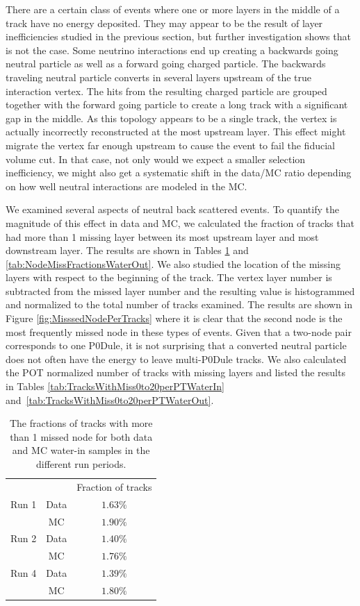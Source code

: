 There are a certain class of events where one or more layers in the middle of a track have no energy deposited. They may appear to be the result of layer inefficiencies studied in the previous section, but further investigation shows that is not the case. Some neutrino interactions end up creating a backwards going neutral particle as well as a forward going charged particle. The backwards traveling neutral particle converts in several layers upstream of the true interaction vertex. The hits from the resulting charged particle are grouped together with the forward going particle to create a long track with a significant gap in the middle. As this topology appears to be a single track, the vertex is actually incorrectly reconstructed at the most upstream layer. This effect might migrate the vertex far enough upstream to cause the event to fail the fiducial volume cut. In that case, not only would we expect a smaller selection inefficiency, we might also get a systematic shift in the data/MC ratio depending on how well neutral interactions are modeled in the MC. 

We examined several aspects of neutral back scattered events. To quantify the magnitude of this effect in data and MC, we calculated the fraction of tracks that had more than 1 missing layer between its most upstream layer and most downstream layer. The results are shown in Tables \ref{tab:NodeMissFractionsWaterIn} and \ref{tab:NodeMissFractionsWaterOut}. We also studied the location of the missing layers with respect to the beginning of the track. The vertex layer number is subtracted from the missed layer number and the resulting value is histogrammed and normalized to the total number of tracks examined. The results are shown in Figure \ref{fig:MisssedNodePerTracks} where it is clear that the second node is the most frequently missed node in these types of events. Given that a two-node pair corresponds to one P0Dule, it is not surprising that a converted neutral particle does not often have the energy to leave multi-P0Dule tracks. We also calculated the POT normalized number of tracks with missing layers and listed the results in Tables \ref{tab:TracksWithMiss0to20perPTWaterIn} and~\ref{tab:TracksWithMiss0to20perPTWaterOut}.

\begin{table}[h]
\caption{The fractions of tracks with more than 1 missed node 
for both data and MC water-in samples in the different run periods.}
\centering
\begin{tabular}{lcc}\toprule
      & &  Fraction of tracks \\
\cline{2-3}
Run 1 & Data & $1.63\%$  \\ 
      & MC & $1.90\%$  \\ 
\cline{2-3}
Run 2 & Data & $1.40\%$  \\ 
      & MC & $1.76\%$ \\ 
\cline{2-3}
Run 4 & Data & $1.39\%$  \\ 
      & MC & $1.80\%$ \\ 
\bottomrule
\end{tabular}
\label{tab:NodeMissFractionsWaterIn}
\end{table}

